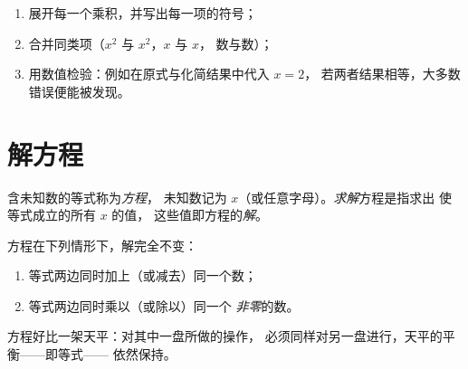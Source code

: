 \begin{method}[展开并化简]\label{met:g8:equations:reduce}
\begin{enumerate}
  \item 展开每一个乘积，并写出每一项的符号；
  \item 合并同类项（$x^2$ 与 $x^2$，$x$ 与 $x$，
        数与数）；
  \item 用数值检验：例如在原式与化简结果中代入 $x = 2$，
        若两者结果相等，大多数错误便能被发现。
\end{enumerate}
\end{method}

\section{解方程}

\begin{definition}[方程]\label{def:g8:equations:def}
含未知数的等式称为\emph{方程}，
未知数记为 $x$（或任意字母）。\emph{求解}方程是指求出
使等式成立的所有 $x$ 的值，
这些值即方程的\emph{解}。
\end{definition}

\begin{theorem}[等式的平衡法则]\label{thm:g8:equations:balance}
方程在下列情形下，解完全不变：
\begin{enumerate}
  \item 等式两边同时加上（或减去）同一个数；
  \item 等式两边同时乘以（或除以）同一个
        \emph{非零}的数。
\end{enumerate}
\end{theorem}
\admitted

\begin{omfigure}

{\small 方程好比一架天平：对其中一盘所做的操作，
必须同样对另一盘进行，天平的平衡——即等式——
依然保持。}
\end{omfigure}

